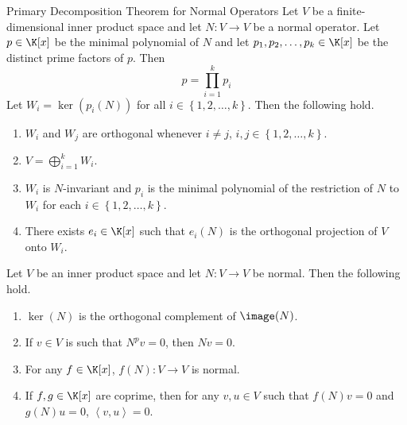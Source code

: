 \documentclass[linearalgebra]{subfiles}
\begin{document}
    \clearpage
    \begin{theorem}{Primary Decomposition Theorem for Normal Operators}
        Let $V$ be a finite-dimensional inner product space and let $N:V\to V$ be a normal operator. Let $p\in\K[x]$ be the minimal polynomial of $N$ and let $p_1,p_2,\ldots,p_k\in\K[x]$ be the distinct prime factors of $p$. Then
        \begin{equation*}
            p = \prod^{k}_{i=1} p_i
        \end{equation*}
        Let $W_i=\ker\left( p_i(N) \right)$ for all $i\in\left\lbrace 1,2,\ldots,k \right\rbrace$. Then the following hold.
        \begin{enumerate}
            \item $W_i$ and $W_j$ are orthogonal whenever $i\neq j$, $i,j\in\left\lbrace 1,2,\ldots,k \right\rbrace$.
            \item $V = \bigoplus^{k}_{i=1} W_i$.
            \item $W_i$ is $N$-invariant and $p_i$ is the minimal polynomial of the restriction of $N$ to $W_i$ for each $i\in\left\lbrace 1,2,\ldots,k \right\rbrace$.
            \item There exists $e_i\in\K[x]$ such that $e_i(N)$ is the orthogonal projection of $V$ onto $W_i$.
        \end{enumerate}
    \end{theorem}

    \begin{lemma_inside}{}
        Let $V$ be an inner product space and let $N:V\to V$ be normal. Then the following hold.
        \begin{enumerate}
            \item $\ker(N)$ is the orthogonal complement of $\image(N)$.
            \item If $v\in V$ is such that $N^pv = 0$, then $Nv = 0$.
            \item For any $f\in\K[x]$, $f(N):V\to V$ is normal.
            \item If $f,g\in\K[x]$ are coprime, then for any $v,u\in V$ such that $f(N)v=0$ and $g(N)u=0$, $\left\langle v, u\right\rangle =0$.
        \end{enumerate}
    \end{lemma_inside}
\end{document}
